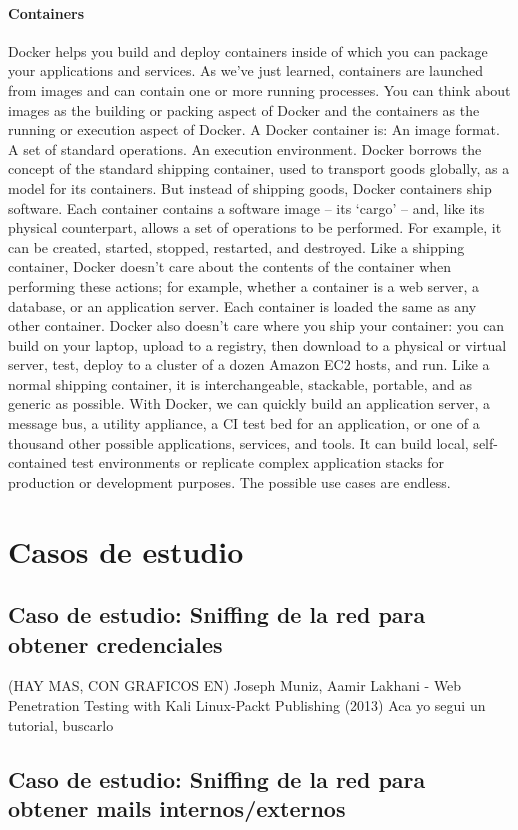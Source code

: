 \paragraph{Containers}
Docker helps you build and deploy containers inside of which you can
package your applications and services. As we’ve just learned, containers
are launched from images and can contain one or more running processes.
You can think about images as the building or packing aspect of Docker and
the containers as the running or execution aspect of Docker.
A Docker container is:
An image format.
A set of standard operations.
An execution environment.
Docker borrows the concept of the standard shipping container, used to
transport goods globally, as a model for its containers. But instead of
shipping goods, Docker containers ship software.
Each container contains a software image – its ‘cargo’ – and, like its
physical counterpart, allows a set of operations to be performed. For
example, it can be created, started, stopped, restarted, and destroyed.
Like a shipping container, Docker doesn’t care about the contents of the
container when performing these actions; for example, whether a container
is a web server, a database, or an application server. Each container is
loaded the same as any other container.
Docker also doesn’t care where you ship your container: you can build on
your laptop, upload to a registry, then download to a physical or virtual
server, test, deploy to a cluster of a dozen Amazon EC2 hosts, and run. Like
a normal shipping container, it is interchangeable, stackable, portable, and
as generic as possible.
With Docker, we can quickly build an application server, a message bus, a
utility appliance, a CI test bed for an application, or one of a thousand other
possible applications, services, and tools. It can build local, self-contained
test environments or replicate complex application stacks for production or
development purposes. The possible use cases are endless.
   \section{Casos de estudio}
\subsection{Caso de estudio: Sniffing de la red para obtener credenciales}
(HAY MAS, CON GRAFICOS EN)
Joseph Muniz, Aamir Lakhani - Web Penetration Testing with Kali Linux-Packt Publishing (2013)
Aca yo segui un tutorial, buscarlo
\subsection{Caso de estudio: Sniffing de la red para obtener mails internos/externos}

